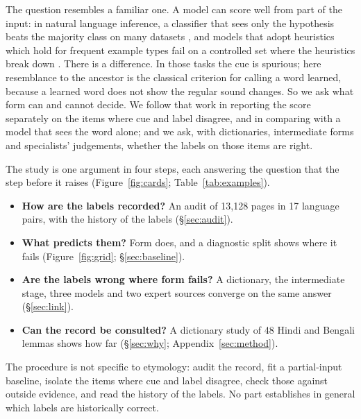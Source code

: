 \documentclass[11pt]{article}
\begin{document}
The question resembles a familiar one. A model can score well from part of the input: in natural language inference, a classifier that sees only the hypothesis beats the majority class on many datasets \citep{poliak2018hypothesis,gururangan2018annotation}, and models that adopt heuristics which hold for frequent example types fail on a controlled set where the heuristics break down \citep{mccoy2019right}. There is a difference. In those tasks the cue is spurious; here resemblance to the ancestor is the classical criterion for calling a word learned, because a learned word does not show the regular sound changes. So we ask what form can and cannot decide. We follow that work in reporting the score separately on the items where cue and label disagree, and in comparing with a model that sees the word alone; and we ask, with dictionaries, intermediate forms and specialists' judgements, whether the labels on those items are right.

The study is one argument in four steps, each answering the question that the step before it raises (Figure~\ref{fig:cards}; Table~\ref{tab:examples}).
\begin{itemize}
\item \textbf{How are the labels recorded?} An audit of 13,128 pages in 17 language pairs, with the history of the labels (\S\ref{sec:audit}).
\item \textbf{What predicts them?} Form does, and a diagnostic split shows where it fails (Figure~\ref{fig:grid}; \S\ref{sec:baseline}).
\item \textbf{Are the labels wrong where form fails?} A dictionary, the intermediate stage, three models and two expert sources converge on the same answer (\S\ref{sec:link}).
\item \textbf{Can the record be consulted?} A dictionary study of 48 Hindi and Bengali lemmas shows how far (\S\ref{sec:why}; Appendix~\ref{sec:method}).
\end{itemize}
The procedure is not specific to etymology: audit the record, fit a partial-input baseline, isolate the items where cue and label disagree, check those against outside evidence, and read the history of the labels. No part establishes in general which labels are historically correct.
\end{document}
